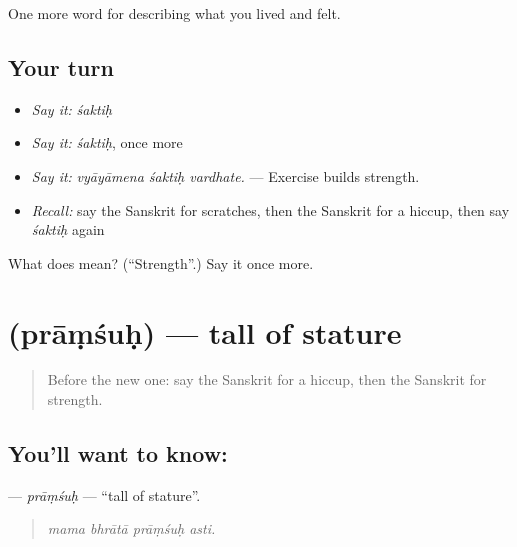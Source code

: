 \begin{grammarlens}[title={What you've built}]
One more word for describing what you lived and felt.
\end{grammarlens}

\subsection*{Your turn}
\begin{itemize}
\raggedright
  \item \emph{Say it:} \emph{śaktiḥ}
  \item \emph{Say it:} \emph{śaktiḥ}, once more
  \item \emph{Say it:} \emph{vyāyāmena śaktiḥ vardhate.} — Exercise builds strength.
  \item \emph{Recall:} say the Sanskrit for scratches, then the Sanskrit for a hiccup, then say \emph{śaktiḥ} again
\end{itemize}

\begin{tcolorbox}[breakable,colback=teal!4,colframe=teal!35!black,title={Before you move on}]
What does  mean? (\textquotedblleft{}Strength\textquotedblright{}.) Say it once more.
\end{tcolorbox}
\section[\texorpdfstring{\sk{प्रांशुः} (prāṃśuḥ)}{प्रांशुः (prāṃśuḥ)}]{ (prāṃśuḥ) — tall of stature}

\label{lesson:SA-C476-pramsuh}



\begin{quote}
Before the new one: say the Sanskrit for a hiccup, then the Sanskrit for strength.
\end{quote}

\subsection*{You'll want to know: }
\textbf{} — \emph{prāṃśuḥ} — \textquotedblleft{}tall of stature\textquotedblright{}.

\begin{quote}
   
\end{quote}

\begin{quote}
\emph{mama bhrātā prāṃśuḥ asti.}
\end{quote}

